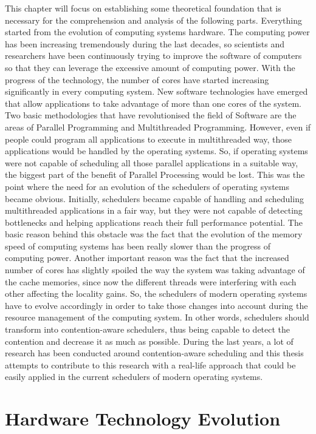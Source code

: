 \documentclass[diploma]{Styles/softlab-thesis}
\begin{document}
This chapter will focus on establishing some theoretical foundation that is necessary for the comprehension and analysis of the following parts. Everything started from the evolution of computing systems hardware. The computing power has been increasing tremendously during the last decades, so scientists and researchers have been continuously trying to improve the software of computers so that they can leverage the excessive amount of computing power. With the progress of the technology, the number of cores have started increasing significantly in every computing system. New software technologies have emerged that allow applications to take advantage of more than one cores of the system. Two basic methodologies that have revolutionised the field of Software are the areas of Parallel Programming and Multithreaded Programming. However, even if people could program all applications to execute in multithreaded way, those applications would be handled by the operating systems. So, if operating systems were not capable of scheduling all those parallel applications in a suitable way, the biggest part of the benefit of Parallel Processing would be lost. This was the point where the need for an evolution of the schedulers of operating systems became obvious. Initially, schedulers became capable of handling and scheduling multithreaded applications in a fair way, but they were not capable of detecting bottlenecks and helping applications reach their full performance potential. The basic reason behind this obstacle was the fact that the evolution of the memory speed of computing systems has been really slower than the progress of computing power. Another important reason was the fact that the increased number of cores has slightly spoiled the way the system was taking advantage of the cache memories, since now the different threads were interfering with each other affecting the locality gains. So, the schedulers of modern operating systems have to evolve accordingly in order to take those changes into account during the resource management of the computing system. In other words, schedulers should transform into contention-aware schedulers, thus being capable to detect the contention and decrease it as much as possible. During the last years, a lot of research has been conducted around contention-aware scheduling and this thesis attempts to contribute to this research with a real-life approach that could be easily applied in the current schedulers of modern operating systems.

\section{Hardware Technology Evolution}
\end{document}
